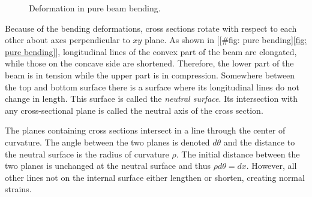 \documentclass[a4paper,openany,12pt]{book}
\begin{document}
\begin{figure}[h]
  \centering
  \caption{Deformation in pure beam bending.}
\end{figure}

Because of the bending deformations, cross sections rotate with respect
to each other about axes perpendicular to \(xy\) plane. As shown in
[[\#fig: pure bending]\ref{fig: pure bending}], longitudinal lines of the
convex part of the beam are elongated, while those on the concave side
are shortened. Therefore, the lower part of the beam is in tension while
the upper part is in compression. Somewhere between the top and bottom
surface there is a surface where its longitudinal lines do not change in
length. This surface is called the \emph{neutral surface}. Its intersection
with any cross-sectional plane is called the neutral axis of the cross
section.

The planes containing cross sections intersect in a line through the
center of curvature. The angle between the two planes is denoted
\(d\theta\) and the distance to the neutral surface is the radius of
curvature \(\rho\). The initial distance between the two planes is
unchanged at the neutral surface and thus \(\rho d \theta = dx\). However,
all other lines not on the internal surface either lengthen or shorten,
creating normal strains.
\end{document}
